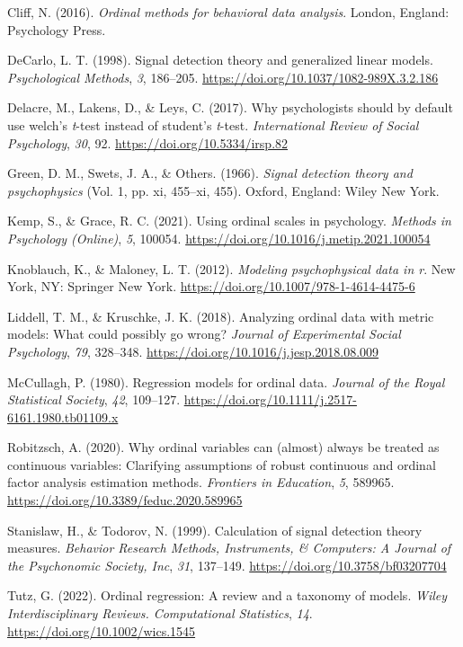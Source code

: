 \documentclass[
  man,floatsintext]{apa6}
\newlength{\cslhangindent}
\newenvironment{CSLReferences}[2] %
 {\begin{list}{}{%
  \setlength{\itemindent}{0pt}
  \setlength{\leftmargin}{0pt}
  \setlength{\parsep}{0pt}
  \ifodd #1
   \setlength{\leftmargin}{\cslhangindent}
   \setlength{\itemindent}{-1\cslhangindent}
  \fi
  \setlength{\itemsep}{#2\baselineskip}}}
 {\end{list}}
\begin{document}
\label{refs}
\begin{CSLReferences}{1}{0}
Cliff, N. (2016). \emph{Ordinal methods for behavioral data analysis}. London, England: Psychology Press.

DeCarlo, L. T. (1998). Signal detection theory and generalized linear models. \emph{Psychological Methods}, \emph{3}, 186--205. \url{https://doi.org/10.1037/1082-989X.3.2.186}

Delacre, M., Lakens, D., \& Leys, C. (2017). Why psychologists should by default use welch's \emph{t}-test instead of student's \emph{t}-test. \emph{International Review of Social Psychology}, \emph{30}, 92. \url{https://doi.org/10.5334/irsp.82}

Green, D. M., Swets, J. A., \& Others. (1966). \emph{Signal detection theory and psychophysics} (Vol. 1, pp. xi, 455--xi, 455). Oxford, England: Wiley New York.

Kemp, S., \& Grace, R. C. (2021). Using ordinal scales in psychology. \emph{Methods in Psychology (Online)}, \emph{5}, 100054. \url{https://doi.org/10.1016/j.metip.2021.100054}

Knoblauch, K., \& Maloney, L. T. (2012). \emph{Modeling psychophysical data in r}. New York, NY: Springer New York. \url{https://doi.org/10.1007/978-1-4614-4475-6}

Liddell, T. M., \& Kruschke, J. K. (2018). Analyzing ordinal data with metric models: What could possibly go wrong? \emph{Journal of Experimental Social Psychology}, \emph{79}, 328--348. \url{https://doi.org/10.1016/j.jesp.2018.08.009}

McCullagh, P. (1980). Regression models for ordinal data. \emph{Journal of the Royal Statistical Society}, \emph{42}, 109--127. \url{https://doi.org/10.1111/j.2517-6161.1980.tb01109.x}

Robitzsch, A. (2020). Why ordinal variables can (almost) always be treated as continuous variables: Clarifying assumptions of robust continuous and ordinal factor analysis estimation methods. \emph{Frontiers in Education}, \emph{5}, 589965. \url{https://doi.org/10.3389/feduc.2020.589965}

Stanislaw, H., \& Todorov, N. (1999). Calculation of signal detection theory measures. \emph{Behavior Research Methods, Instruments, \& Computers: A Journal of the Psychonomic Society, Inc}, \emph{31}, 137--149. \url{https://doi.org/10.3758/bf03207704}

Tutz, G. (2022). Ordinal regression: A review and a taxonomy of models. \emph{Wiley Interdisciplinary Reviews. Computational Statistics}, \emph{14}. \url{https://doi.org/10.1002/wics.1545}

\end{CSLReferences}
\end{document}
